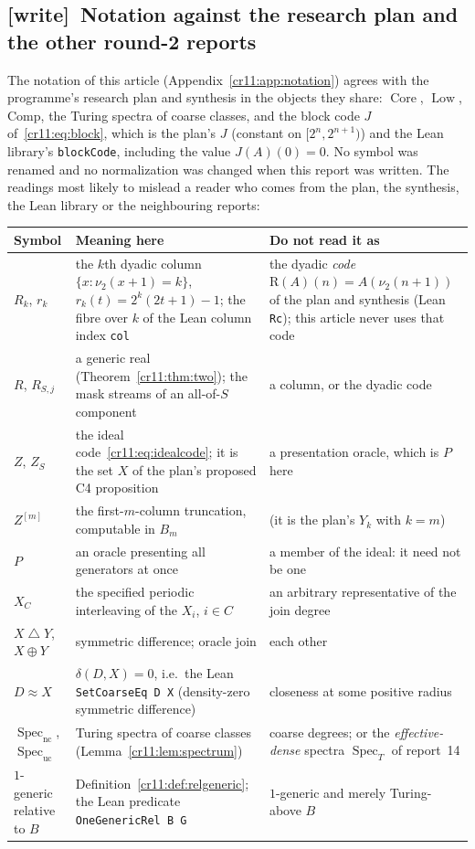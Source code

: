 \documentclass[11pt,letterpaper]{article}
\theoremstyle{plain}
\theoremstyle{definition}
\theoremstyle{remark}
\numberwithin{equation}{section}
\newcommand{\Core}{\operatorname{Core}}
\newcommand{\Spec}{\operatorname{Spec}}
\newcommand{\Low}{\operatorname{Low}}
\newcommand{\Comp}{\mathrm{Comp}}
\newcommand{\bitsum}{\mathbin{\triangle}}
\newcommand{\join}{\mathbin{\oplus}}
\newcommand{\nc}{\mathrm{nc}}
\newcommand{\uc}{\mathrm{uc}}
\newcommand{\wtag}{\textup{[write]}}
\begin{document}
\subsection{\wtag\ Notation against the research plan and the other round-2 reports}\label{cr11:sec:wnotation}

The notation of this article (Appendix~\ref{cr11:app:notation}) agrees with the programme's
research plan \cite{RepoPlan} and synthesis \cite{RepoSynthesis} in the
objects they share: $\Core$, $\Low$, $\Comp$, the Turing spectra of coarse
classes, and the block code $J$ of~\eqref{cr11:eq:block}, which is the
plan's $J$ (constant on $[2^n,2^{n+1})$) and the Lean library's
\texttt{blockCode}, including the value $J(A)(0)=0$. No symbol was renamed
and no normalization was changed when this report was written. The
readings most likely to mislead a reader who comes from the plan, the
synthesis, the Lean library or the neighbouring reports:

\begin{center}\small
\begin{tabularx}{\textwidth}{@{}>{\raggedright\arraybackslash}p{}>{\raggedright\arraybackslash}X>{\raggedright\arraybackslash}X@{}}
\toprule
Symbol & Meaning here & Do not read it as\\
\midrule
$R_k$, $r_k$ & the $k$th dyadic column $\{x:\nu_2(x+1)=k\}$, $r_k(t)=2^k(2t+1)-1$; the fibre over $k$ of the Lean column index \texttt{col} & the dyadic \emph{code} $\mathrm R(A)(n)=A(\nu_2(n+1))$ of the plan and synthesis (Lean \texttt{Rc}); this article never uses that code\\
$R$, $R_{S,j}$ & a generic real (Theorem~\ref{cr11:thm:two}); the mask streams of an all-of-$S$ component & a column, or the dyadic code\\
$Z$, $Z_S$ & the ideal code~\eqref{cr11:eq:idealcode}; it is the set $X$ of the plan's proposed C4 proposition & a presentation oracle, which is $P$ here\\
$Z^{[m]}$ & the first-$m$-column truncation, computable in $B_m$ & (it is the plan's $Y_k$ with $k=m$)\\
$P$ & an oracle presenting all generators at once & a member of the ideal: it need not be one\\
$X_C$ & the specified periodic interleaving of the $X_i$, $i\in C$ & an arbitrary representative of the join degree\\
$X\bitsum Y$, $X\join Y$ & symmetric difference; oracle join & each other\\
$D\approx X$ & $\delta(D,X)=0$, i.e.\ the Lean \texttt{SetCoarseEq D X} (density-zero symmetric difference) & closeness at some positive radius\\
$\Spec_{\nc}$, $\Spec_{\uc}$ & Turing spectra of coarse classes (Lemma~\ref{cr11:lem:spectrum}) & coarse degrees; or the \emph{effective-dense} spectra $\Spec_T$ of report~14\\
$1$-generic relative to $B$ & Definition~\ref{cr11:def:relgeneric}; the Lean predicate \texttt{OneGenericRel B G} & $1$-generic and merely Turing-above $B$\\
\bottomrule
\end{tabularx}
\end{center}
\end{document}
